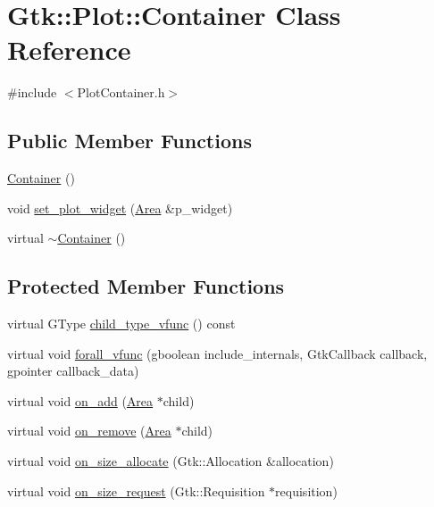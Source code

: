 \hypertarget{classGtk_1_1Plot_1_1Container}{
\section{Gtk::Plot::Container Class Reference}
\label{classGtk_1_1Plot_1_1Container}
}


{\ttfamily \#include $<$PlotContainer.h$>$}\subsection*{Public Member Functions}
\begin{DoxyCompactItemize}
\item 
\hyperlink{classGtk_1_1Plot_1_1Container_af956e659361643a2b642c2005e2da389}{Container} ()
\item 
void \hyperlink{classGtk_1_1Plot_1_1Container_a1d85757151fbc9bfb8f00e60c30e2df4}{set\_\-plot\_\-widget} (\hyperlink{classGtk_1_1Plot_1_1Area}{Area} \&p\_\-widget)
\item 
virtual \hyperlink{classGtk_1_1Plot_1_1Container_ab1e67689eeaee019a1413a9daf6a9208}{$\sim$Container} ()
\end{DoxyCompactItemize}
\subsection*{Protected Member Functions}
\begin{DoxyCompactItemize}
\item 
virtual GType \hyperlink{classGtk_1_1Plot_1_1Container_ab10ca9ae4eadd60258504bc354c771a8}{child\_\-type\_\-vfunc} () const 
\item 
virtual void \hyperlink{classGtk_1_1Plot_1_1Container_aa73effbe8c9a91cdd65dd81d1e0439e5}{forall\_\-vfunc} (gboolean include\_\-internals, GtkCallback callback, gpointer callback\_\-data)
\item 
virtual void \hyperlink{classGtk_1_1Plot_1_1Container_a61d8e687c7aca24ab563ab978a8e225d}{on\_\-add} (\hyperlink{classGtk_1_1Plot_1_1Area}{Area} $\ast$child)
\item 
virtual void \hyperlink{classGtk_1_1Plot_1_1Container_a5f89abb202ae55f0470dabe6b77c7da8}{on\_\-remove} (\hyperlink{classGtk_1_1Plot_1_1Area}{Area} $\ast$child)
\item 
virtual void \hyperlink{classGtk_1_1Plot_1_1Container_a907cdf74d34d90e1383aeaa3d0a57de6}{on\_\-size\_\-allocate} (Gtk::Allocation \&allocation)
\item 
virtual void \hyperlink{classGtk_1_1Plot_1_1Container_a0c6fabd4077b44a65349042c4f1e3774}{on\_\-size\_\-request} (Gtk::Requisition $\ast$requisition)
\end{DoxyCompactItemize}
